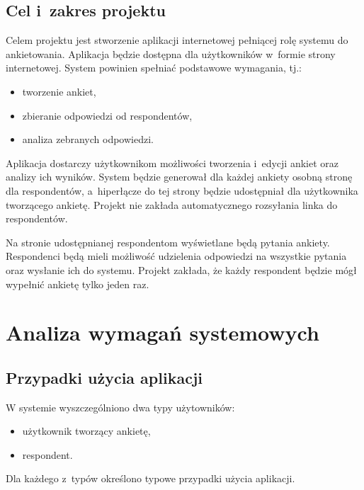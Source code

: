 \documentclass[8pt,a4paper,notitlepage]{article}
\begin{document}
\subsection{Cel i~zakres projektu}
Celem projektu jest stworzenie aplikacji internetowej pełniącej rolę systemu do ankietowania. Aplikacja będzie dostępna dla użytkowników w~formie strony internetowej. System powinien spełniać podstawowe wymagania, tj.:
\begin{itemize}
\item tworzenie ankiet,
\item zbieranie odpowiedzi od respondentów,
\item analiza zebranych odpowiedzi.
\end{itemize}
\par Aplikacja dostarczy użytkownikom możliwości tworzenia i~edycji ankiet oraz analizy ich wyników. System będzie generował dla każdej ankiety osobną stronę dla respondentów, a~hiperłącze do tej strony będzie udostępniał dla użytkownika tworzącego ankietę. Projekt nie zakłada automatycznego rozsyłania linka do respondentów.
\par Na stronie udostępnianej respondentom wyświetlane będą pytania ankiety. Respondenci będą mieli możliwość udzielenia odpowiedzi na wszystkie pytania oraz wysłanie ich do systemu. Projekt zakłada, że każdy respondent będzie mógł wypełnić ankietę tylko jeden raz.

\newpage
\section{Analiza wymagań systemowych}

\subsection{Przypadki użycia aplikacji}
W systemie wyszczególniono dwa typy użytowników: 
\begin{itemize}
\item użytkownik tworzący ankietę,
\item respondent.
\end{itemize}
Dla każdego z~typów określono typowe przypadki użycia aplikacji.
\end{document}
